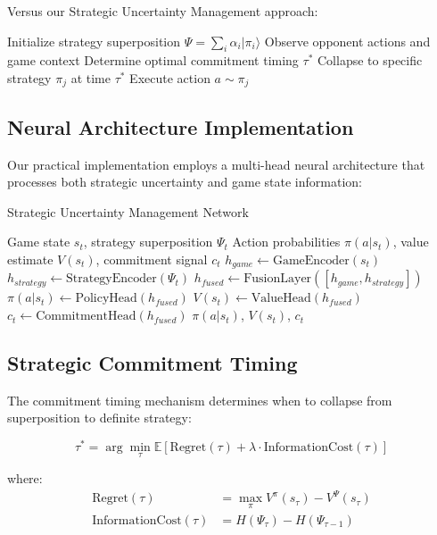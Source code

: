 \documentclass[11pt,a4paper]{article}
\begin{document}
Versus our Strategic Uncertainty Management approach:
\begin{algorithmic}
\STATE Initialize strategy superposition $\Psi = \sum_i \alpha_i |\pi_i\rangle$
\STATE Observe opponent actions and game context
\STATE Determine optimal commitment timing $\tau^*$
\STATE Collapse to specific strategy $\pi_j$ at time $\tau^*$
\STATE Execute action $a \sim \pi_j$
\end{algorithmic}

\subsection{Neural Architecture Implementation}

Our practical implementation employs a multi-head neural architecture that processes both strategic uncertainty and game state information:

\begin{algorithm}
\caption{Strategic Uncertainty Management Network}
\begin{algorithmic}[1]
\REQUIRE Game state $s_t$, strategy superposition $\Psi_t$
\ENSURE Action probabilities $\pi(a|s_t)$, value estimate $V(s_t)$, commitment signal $c_t$
\STATE $h_{game} \leftarrow \text{GameEncoder}(s_t)$
\STATE $h_{strategy} \leftarrow \text{StrategyEncoder}(\Psi_t)$
\STATE $h_{fused} \leftarrow \text{FusionLayer}([h_{game}, h_{strategy}])$
\STATE $\pi(a|s_t) \leftarrow \text{PolicyHead}(h_{fused})$
\STATE $V(s_t) \leftarrow \text{ValueHead}(h_{fused})$
\STATE $c_t \leftarrow \text{CommitmentHead}(h_{fused})$
\RETURN $\pi(a|s_t)$, $V(s_t)$, $c_t$
\end{algorithmic}
\end{algorithm}

\subsection{Strategic Commitment Timing}

The commitment timing mechanism determines when to collapse from superposition to definite strategy:

\begin{equation}
\tau^* = \arg\min_{\tau} \mathbb{E}\left[\text{Regret}(\tau) + \lambda \cdot \text{InformationCost}(\tau)\right]
\end{equation}

where:
\begin{align}
\text{Regret}(\tau) &= \max_{\pi} V^{\pi}(s_\tau) - V^{\Psi}(s_\tau) \\
\text{InformationCost}(\tau) &= H(\Psi_\tau) - H(\Psi_{\tau-1})
\end{align}
\end{document}
